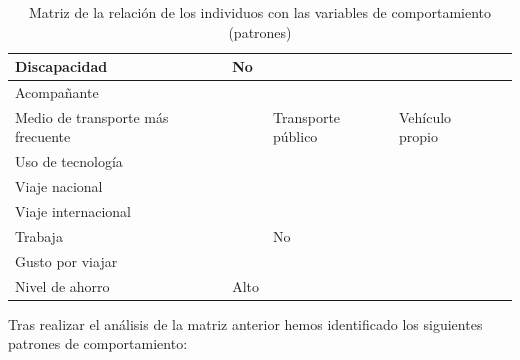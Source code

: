 \begin{table}[H]
\begin{tabular}{|p{10em}|p{7em}|p{7em}|p{7em}|p{8em}|}
        Discapacidad                      & No                                          & \cellcolor{green}{No}                         &                                                   \\ \hline
        Acompañante                       &                                             & \cellcolor{blue}{Familia}                     & \cellcolor{blue}{Familia}                         \\ \hline
        Medio de transporte más frecuente &                                             & Transporte público                            & Vehículo propio                                   \\ \hline
        Uso de tecnología                 &                                             & \cellcolor{green}{Alto}                       & \cellcolor{green}{Alto}                           \\ \hline
        Viaje nacional                    & \cellcolor{orange}{Si}                      & \cellcolor{orange}{Si}                        & \cellcolor{orange}{Si}                            \\ \hline
        Viaje internacional               & \cellcolor{orange}{Si}                      & \cellcolor{orange}{Si}                        & \cellcolor{orange}{Si}                            \\ \hline
        Trabaja                           & \cellcolor{yellow}{Si}                      & No                                            &                                                   \\ \hline
        Gusto por viajar                  &                                             & \cellcolor{green}{Si}                         & \cellcolor{green}{Si}                             \\ \hline
        Nivel de ahorro                   & Alto                                        & \cellcolor{purple}{Alto}                      & \cellcolor{purple}{Alto}                          \\ \hline
    \end{tabular}
    \caption{Matriz de la relación de los individuos con las variables de comportamiento (patrones)}
    \label{table:relacion-individuos-variables-patrones}
\end{table}
Tras realizar el análisis de la matriz anterior hemos identificado los siguientes patrones de comportamiento:

